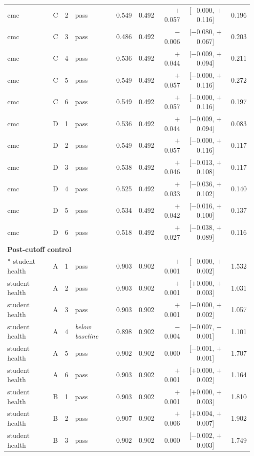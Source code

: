 {\begin{longtable}{lccl rrrcr}
cmc & C & 2 & pass & 0.549 & 0.492 & $+$0.057 & [$-$0.000, $+$0.116] & 0.196 \\
cmc & C & 3 & pass & 0.486 & 0.492 & $-$0.006 & [$-$0.080, $+$0.067] & 0.203 \\
cmc & C & 4 & pass & 0.536 & 0.492 & $+$0.044 & [$-$0.009, $+$0.094] & 0.211 \\
cmc & C & 5 & pass & 0.549 & 0.492 & $+$0.057 & [$-$0.000, $+$0.116] & 0.272 \\
cmc & C & 6 & pass & 0.549 & 0.492 & $+$0.057 & [$-$0.000, $+$0.116] & 0.197 \\
\addlinespace[2pt]
cmc & D & 1 & pass & 0.536 & 0.492 & $+$0.044 & [$-$0.009, $+$0.094] & 0.083 \\
cmc & D & 2 & pass & 0.549 & 0.492 & $+$0.057 & [$-$0.000, $+$0.116] & 0.117 \\
cmc & D & 3 & pass & 0.538 & 0.492 & $+$0.046 & [$-$0.013, $+$0.108] & 0.117 \\
cmc & D & 4 & pass & 0.525 & 0.492 & $+$0.033 & [$-$0.036, $+$0.102] & 0.140 \\
cmc & D & 5 & pass & 0.534 & 0.492 & $+$0.042 & [$-$0.016, $+$0.100] & 0.137 \\
cmc & D & 6 & pass & 0.518 & 0.492 & $+$0.027 & [$-$0.038, $+$0.089] & 0.116 \\
\midrule
\multicolumn{9}{l}{\textbf{Post-cutoff control}}\\*
\addlinespace[2pt]
student health & A & 1 & pass & 0.903 & 0.902 & $+$0.001 & [$-$0.000, $+$0.002] & 1.532 \\
student health & A & 2 & pass & 0.903 & 0.902 & $+$0.001 & [$+$0.000, $+$0.003] & 1.031 \\
student health & A & 3 & pass & 0.903 & 0.902 & $+$0.001 & [$-$0.000, $+$0.002] & 1.057 \\
student health & A & 4 & \emph{below baseline} & 0.898 & 0.902 & $-$0.004 & [$-$0.007, $-$0.001] & 1.101 \\
student health & A & 5 & pass & 0.902 & 0.902 & 0.000 & [$-$0.001, $+$0.001] & 1.707 \\
student health & A & 6 & pass & 0.903 & 0.902 & $+$0.001 & [$+$0.000, $+$0.002] & 1.164 \\
\addlinespace[2pt]
student health & B & 1 & pass & 0.903 & 0.902 & $+$0.001 & [$+$0.000, $+$0.003] & 1.810 \\
student health & B & 2 & pass & 0.907 & 0.902 & $+$0.006 & [$+$0.004, $+$0.007] & 1.902 \\
student health & B & 3 & pass & 0.902 & 0.902 & 0.000 & [$-$0.002, $+$0.003] & 1.749 \\

\end{longtable}}
